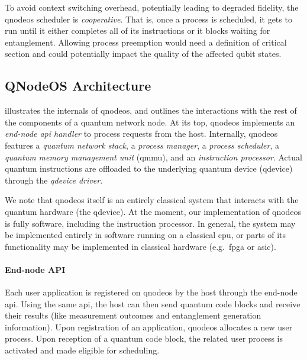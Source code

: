 To avoid context switching overhead, potentially leading to degraded fidelity, the
\acrshort{qnodeos} scheduler is \emph{cooperative}. That is, once a process is scheduled, it gets to
run until it either completes all of its instructions or it blocks waiting for entanglement.
Allowing process preemption would need a definition of critical section and could potentially impact
the quality of the affected qubit states.

\subsection{QNodeOS Architecture}

 illustrates the internals of \acrshort{qnodeos}, and outlines the
interactions with the rest of the components of a quantum network node. At its top,
\acrshort{qnodeos} implements an \emph{end-node \acrshort{api} handler} to process requests from the
host. Internally, \acrshort{qnodeos} features a \emph{quantum network stack}, a \emph{process
manager}, a \emph{process scheduler}, a \emph{quantum memory management unit} (\acrshort{qmmu}), and
an \emph{instruction processor}. Actual quantum instructions are offloaded to the underlying quantum
device (\acrshort{qdevice}) through the \emph{\acrshort{qdevice} driver}.

We note that \acrshort{qnodeos} itself is an entirely classical system that interacts with the
quantum hardware (the \acrshort{qdevice}). At the moment, our implementation of \acrshort{qnodeos}
is fully software, including the instruction processor. In general, the system may be implemented
entirely in software running on a classical \acrshort{cpu}, or parts of its functionality may be
implemented in classical hardware (e.g.~\acrshort{fpga} or \acrshort{asic}).

\paragraph{End-node API}

Each user application is registered on \acrshort{qnodeos} by the host through the end-node
\acrshort{api}. Using the same \acrshort{api}, the host can then send quantum code blocks and
receive their results (like measurement outcomes and entanglement generation information). Upon
registration of an application, \acrshort{qnodeos} allocates a new user process. Upon reception of a
quantum code block, the related user process is activated and made eligible for scheduling.

